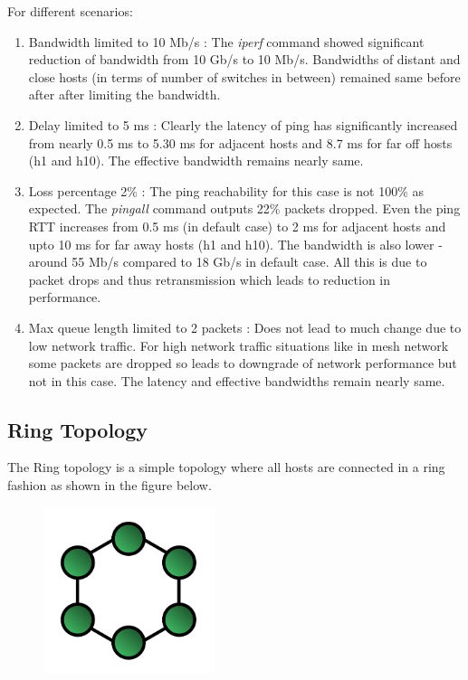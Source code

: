 \documentclass[a4paper, 11pt]{article}
\begin{document}
For different scenarios:
\begin{enumerate}
\item Bandwidth limited to 10 Mb/s : The \textit{iperf} command showed significant reduction of bandwidth from 10 Gb/s to 10 Mb/s. Bandwidths of distant and close hosts (in terms of number of switches in between) remained same before after after limiting the bandwidth.
\item Delay limited to 5 ms : Clearly the latency of ping has significantly increased from nearly 0.5 ms to 5.30 ms for adjacent hosts and 8.7 ms for far off hosts (h1 and h10). The effective bandwidth remains nearly same.
\item Loss percentage 2\% : The ping reachability for this case is not 100\% as expected. The \textit{pingall} command outputs 22\% packets dropped. Even the ping RTT increases from 0.5 ms (in default case) to 2 ms for adjacent hosts and upto 10 ms for far away hosts (h1 and h10). The bandwidth is also lower - around 55 Mb/s compared to 18 Gb/s in default case. All this is due to packet drops and thus retransmission which leads to reduction in performance.
\item Max queue length limited to 2 packets : Does not lead to much change due to low network traffic. For high network traffic situations like in mesh network some packets are dropped so leads to downgrade of network performance but not in this case. The latency and effective bandwidths remain nearly same.
\end{enumerate}


\subsection{Ring Topology}

The Ring topology is a simple topology where all hosts are connected in a ring fashion as shown in the figure below.

\begin{figure}[h]
\centering %
\includegraphics[width=5cm]{ring}
\end{figure}
\end{document}
